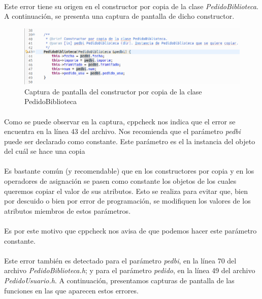 		\paragraph{}Este error tiene su origen en el constructor por copia de la clase \textit{PedidoBiblioteca}. A continuación, se presenta una captura de pantalla de dicho constructor.
		
		\begin{figure}[H]
			\centering
			\includegraphics[scale=0.55]{img/captura54.png}
			\caption{Captura de pantalla del constructor por copia de la clase PedidoBiblioteca}
			\label{captura54}
		\end{figure}
	
		\paragraph{}Como se puede observar en la captura, cppcheck nos indica que el error se encuentra en la línea 43 del archivo. Nos recomienda que el parámetro \textit{pedbi} puede ser declarado como constante. Este parámetro es el la instancia del objeto del cuál se hace una copia
		
		\paragraph{}Es bastante común (y recomendable) que en los constructores por copia y en los operadores de asignación se pasen como constante los objetos de los cuales queremos copiar el valor de sus atributos. Esto se realiza para evitar que, bien por descuido o bien por error de programación, se modifiquen los valores de los atributos miembros de estos parámetros.
		
		\paragraph{}Es por este motivo que cppcheck nos avisa de que podemos hacer este parámetro constante.
		
		\paragraph{}Este error también es detectado para el parámetro \textit{pedbi}, en la línea 70 del archivo \textit{PedidoBiblioteca.h}; y para el parámetro \textit{pedido}, en la línea 49 del archivo \textit{PedidoUsuario.h}. A continuación, presentamos capturas de pantalla de las funciones en las que aparecen estos errores.
		
